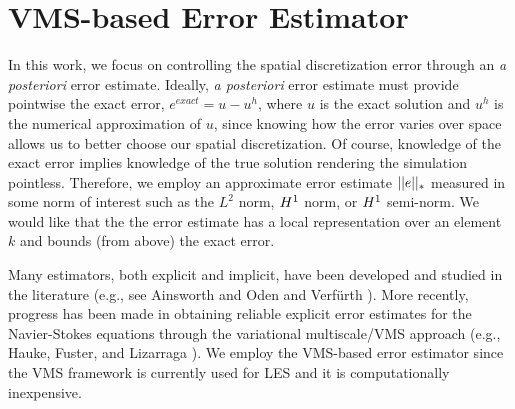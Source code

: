 \chapter{VMS-based Error Estimator}

\label{chapter:APEE} %


In this work, we focus on controlling the spatial discretization error through an \textit{a posteriori} error estimate.
Ideally, \textit{a posteriori} error estimate must provide pointwise the exact error, $e^{exact}=u-u^h$, where $u$ is the exact solution and $u^h$ is the numerical approximation of $u$, since knowing how the error varies over space allows us to better choose our spatial discretization. 
Of course, knowledge of the exact error implies knowledge of the true solution rendering the simulation pointless.
Therefore, we employ an approximate error estimate $||e||_{*}$ measured in some norm of interest such as the $L^2$ norm, $H^{1}$ norm, or $H^{1}$ semi-norm.
We would like that the the error estimate has a local representation over an element $k$ and bounds (from above) the exact error.




Many estimators, both explicit and implicit, have been developed and studied in the literature (e.g., see Ainsworth and Oden \cite{ainsworth2011book} and Verf\"urth \cite{verfurth2013posteriori}).
More recently, progress has been made in obtaining reliable explicit error estimates for the Navier-Stokes equations through the variational multiscale/VMS approach (e.g., Hauke, Fuster, and Lizarraga \cite{hauke2015variational}).
We employ the VMS-based error estimator since the VMS framework is currently used for LES and it is computationally inexpensive.

